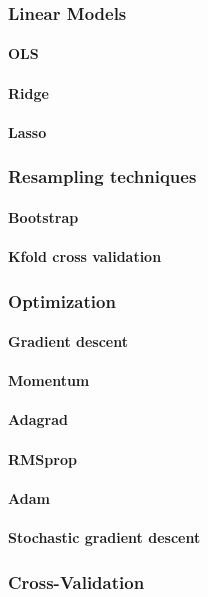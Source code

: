 \documentclass[aps,rmp,reprint,amsmath,amssymb,longbibliography]{revtex4-1}
\begin{document}
\subsubsection{Linear Models}
\paragraph{OLS}
\paragraph{Ridge}
\paragraph{Lasso}
\subsubsection{Resampling techniques}
\paragraph{Bootstrap}
\paragraph{Kfold cross validation}
\subsubsection{Optimization}
\paragraph{Gradient descent}
\paragraph{Momentum}
\paragraph{Adagrad}
\paragraph{RMSprop}
\paragraph{Adam}
\paragraph{Stochastic gradient descent}
\subsubsection{Cross-Validation}
\end{document}
